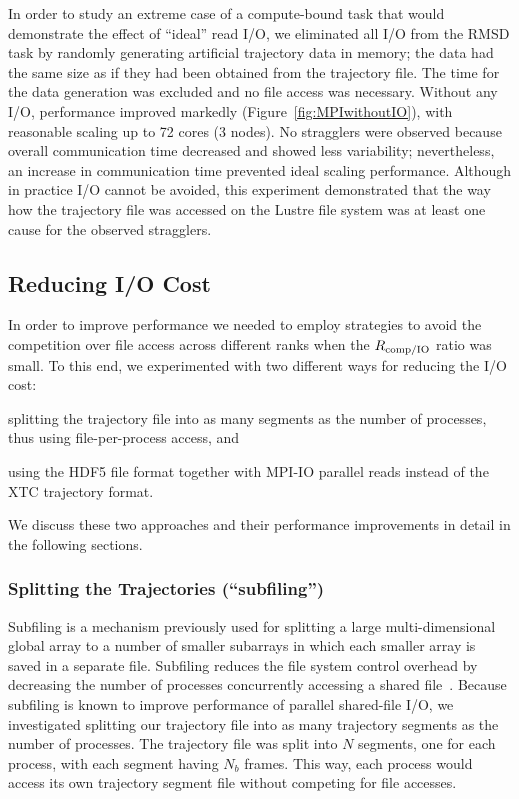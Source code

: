In order to study an extreme case of a compute-bound task that would demonstrate the effect of ``ideal'' read I/O, we eliminated all I/O from the RMSD task by randomly generating artificial trajectory data in memory; the data had the same size as if they had been obtained from the trajectory file.
The time for the data generation was excluded and no file access was necessary. 
Without any I/O, performance improved markedly (Figure~\ref{fig:MPIwithoutIO}), with reasonable scaling up to 72 cores (3 nodes).
No stragglers were observed because overall communication time decreased and showed less variability; nevertheless, an increase in communication time prevented ideal scaling performance.
Although in practice I/O cannot be avoided, this experiment demonstrated that the way how the trajectory file was accessed on the Lustre file system was at least one cause for the observed stragglers.


\subsection{Reducing I/O Cost}
\label{sec:I/O}
In order to improve performance we needed to employ strategies to avoid the competition over file access across different ranks when the $R_{\text{comp/IO}}$ ratio was small.
To this end, we experimented with two different ways for reducing the I/O cost:
\begin{inparaenum}[1)]
	\item splitting the trajectory file into as many segments as the number of processes, thus using file-per-process access, and
	\item using the HDF5 file format together with MPI-IO parallel reads instead of the XTC trajectory format.
\end{inparaenum}
We discuss these two approaches and their performance improvements in detail in the following sections.

\subsubsection{Splitting the Trajectories (``subfiling'')}
\label{splitting-traj}
Subfiling is a mechanism previously used for splitting a large multi-dimensional global array to a number of smaller subarrays in which each smaller array is saved in a separate file. Subfiling reduces the file system control overhead by decreasing the number of processes concurrently accessing a shared file~\cite{scalable-IO, scalable-IO1}.
Because subfiling is known to improve performance of parallel shared-file I/O, we investigated splitting our trajectory file into as many trajectory segments as the number of processes.
The trajectory file was split into $N$ segments, one for each process, with each segment having $N_{b}$ frames. 
This way, each process would access its own trajectory segment file without competing for file accesses. 

